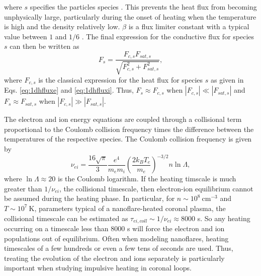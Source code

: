 where $s$ specifies the particles species \citep{bradshaw_explosive_2006}. This prevents the heat flux from becoming unphysically large, particularly during the onset of heating when the temperature is high and the density relatively low. $\beta$ is a flux limiter constant with a typical value between $1$ and $1/6$ \citep{luciani_nonlocal_1983,karpen_nonlocal_1987}. The final expression for the conductive flux for species $s$ can then be written as
\begin{equation}
	F_s=\frac{F_{c,s}F_{sat,s}}{\sqrt{F_{c,s}^2 + F_{sat,s}^2}},
\end{equation}
where $F_{c,s}$ is the classical expression for the heat flux for species $s$ as given in Eqs. \ref{eq:1dhfluxe} and \ref{eq:1dhfluxi}. Thus, $F_s\approx F_{c,s}$ when $|F_{c,s}|\ll|F_{sat,s}|$ and $F_s\approx F_{sat,s}$ when $|F_{c,s}|\gg|F_{sat,s}|$.
%
\par The electron and ion energy equations are coupled through a collisional term proportional to the Coulomb collision frequency times the difference between the temperatures of the respective species. The Coulomb collision frequency is given by
\begin{equation}
	\nu_{ei} = \frac{16\sqrt{\pi}}{3}\frac{e^4}{m_em_i}\left(\frac{2k_BT_e}{m_e}\right)^{-3/2}n\ln{\Lambda},
\end{equation}
where $\ln{\Lambda}\approx20$ is the Coulomb logarithm. If the heating timscale is much greater than $1/\nu_{ei}$, the collisional timescale, then electron-ion equilibrium cannot be assumed during the heating phase. In particular, for $n\sim10^8~\mathrm{cm}^{-3}$ and $T\sim10^7~\mathrm{K}$, parameters typical of a nanoflare-heated coronal plasma, the collisional timescale can be estimated as $\tau_{ei,coll}\sim1/\nu_{ei}\approx8000$ s. So any heating occurring on a timescale less than 8000 s will force the electron and ion populations out of equilibrium. Often when modeling nanoflares, heating timescales of a few hundreds or even a few tens of seconds are used. Thus, treating the evolution of the electron and ions separately is particularly important when studying impulsive heating in coronal loops.
%
